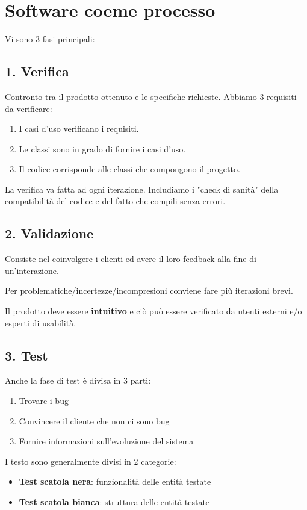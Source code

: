 \documentclass{report}
\begin{document}
\section{Software coeme processo}
Vi sono 3 fasi principali:
\subsection*{1. Verifica}
Contronto tra il prodotto ottenuto e le specifiche richieste. Abbiamo 3 requisiti da verificare:
\begin{enumerate}
    \item I casi d'uso verificano i requisiti.
    \item Le classi sono in grado di fornire i casi d'uso.
    \item Il codice corrisponde alle classi che compongono il progetto.
\end{enumerate}

\noindent
La verifica va fatta ad ogni iterazione. Includiamo i "check di sanità" della compatibilità del codice e del fatto che compili senza errori.
\subsection*{2. Validazione}
Consiste nel coinvolgere i clienti ed avere il loro feedback alla fine di un'interazione.

\noindent
Per problematiche/incertezze/incompresioni conviene fare più iterazioni brevi.

\noindent
Il prodotto deve essere \textbf{intuitivo} e ciò può essere verificato da utenti esterni e/o esperti di usabilità.
\subsection*{3. Test}
Anche la fase di test è divisa in 3 parti:
\begin{enumerate}
    \item Trovare i bug
    \item Convincere il cliente che non ci sono bug
    \item Fornire informazioni sull'evoluzione del sistema
\end{enumerate}

\noindent
I testo sono generalmente divisi in 2 categorie:
\begin{itemize}
    \item \textbf{Test scatola nera}: funzionalità delle entità testate
    \item \textbf{Test scatola bianca}: struttura delle entità testate
\end{itemize}
\end{document}
